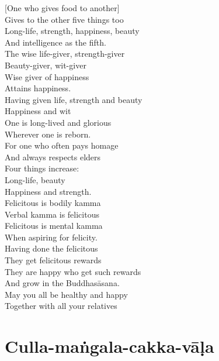\begin{english}
  [One who gives food to another]\\
  Gives to the other five things too\\
  Long-life, strength, happiness, beauty\\
  And intelligence as the fifth.\\
  The wise life-giver, strength-giver\\
  Beauty-giver, wit-giver\\
  Wise giver of happiness\\
  Attains happiness.\\
  Having given life, strength and beauty\\
  Happiness and wit\\
  One is long-lived and glorious\\
  Wherever one is reborn.\\
  For one who often pays homage\\
  And always respects elders\\
  Four things increase:\\
  Long-life, beauty\\
  Happiness and strength.\\
  Felicitous is bodily kamma\\
  Verbal kamma is felicitous\\
  Felicitous is mental kamma\\
  When aspiring for felicity.\\
  Having done the felicitous\\
  They get felicitous rewards\\
  They are happy who get such rewards\\
  And grow in the Buddhasāsana.\\
  May you all be healthy and happy\\
  Together with all your relatives
\end{english}


\section{Culla-maṅgala-cakka-vāḷa}


